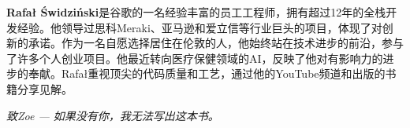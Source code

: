 \textbf{Rafał Świdziński}是谷歌的一名经验丰富的员工工程师，拥有超过12年的全栈开发经验。他领导过思科Meraki、亚马逊和爱立信等行业巨头的项目，体现了对创新的承诺。作为一名自愿选择居住在伦敦的人，他始终站在技术进步的前沿，参与了许多个人创业项目。他最近转向医疗保健领域的AI，反映了他对有影响力的进步的奉献。Rafał重视顶尖的代码质量和工艺，通过他的YouTube频道和出版的书籍分享见解。

\textit{致Zoe --- 如果没有你，我无法写出这本书。}




